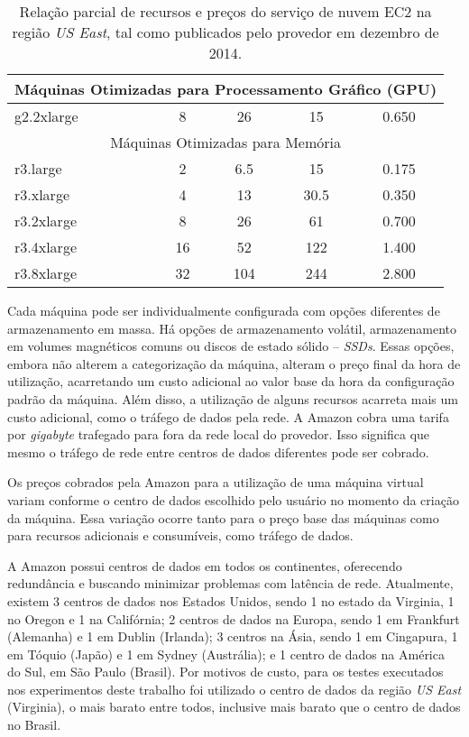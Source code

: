 \begin{table}[t]
\begin{tabular}{|l|c|c|c|c|}
      \multicolumn{5}{|c|}{Máquinas Otimizadas para Processamento Gráfico (GPU)} \\
      \hline      
      g2.2xlarge & 8 & 26 & 15 & 0.650 \\
      \hline      
      \multicolumn{5}{|c|}{Máquinas Otimizadas para Memória} \\
      \hline      
      r3.large & 2 & 6.5 & 15 & 0.175 \\
      r3.xlarge & 4 & 13 & 30.5 & 0.350 \\
      r3.2xlarge & 8 & 26 & 61 & 0.700 \\
      r3.4xlarge & 16 & 52 & 122 & 1.400 \\
      r3.8xlarge & 32 & 104 & 244 & 2.800 \\
    \hline    
  \end{tabular}
  \caption{\label{table:maquinas_ec2}Relação parcial de recursos e preços do serviço de nuvem EC2 na região \emph{US East}, tal como publicados pelo provedor em dezembro de 2014.}
\end{table}


Cada máquina pode ser individualmente configurada com opções diferentes de armazenamento
em massa. Há opções de armazenamento volátil, armazenamento em volumes magnéticos
comuns ou discos de estado sólido -- \emph{SSDs}. Essas opções, embora não alterem
a categorização da máquina, alteram o preço final da hora de utilização, acarretando
um custo adicional ao valor base da hora da configuração padrão da máquina. Além
disso, a utilização de alguns recursos acarreta mais um custo adicional, como o
tráfego de dados pela rede. A Amazon cobra uma tarifa por \emph{gigabyte} trafegado
para fora da rede local do provedor. Isso significa que mesmo o tráfego de rede 
entre centros de dados diferentes pode ser cobrado.

Os preços cobrados pela Amazon para a utilização de uma máquina virtual variam 
conforme o centro de dados escolhido pelo usuário no momento da criação da máquina.
Essa variação ocorre tanto para o preço base das máquinas como para recursos adicionais
e consumíveis, como tráfego de dados.

A Amazon possui centros de dados em todos os continentes, oferecendo redundância
e buscando minimizar problemas com latência de rede. Atualmente, existem 3 centros de
dados nos Estados Unidos, sendo 1 no estado da Virginia, 1 no Oregon e 1 na Califórnia; 2 
centros de dados na Europa, sendo 1 em Frankfurt (Alemanha) e 1 em Dublin (Irlanda); 3 centros na Ásia,
sendo 1 em Cingapura, 1 em Tóquio (Japão) e 1 em Sydney (Austrália); e 1 centro de dados na América do
Sul, em São Paulo (Brasil). Por motivos de custo, para os testes executados nos experimentos 
deste trabalho foi utilizado o centro de dados da região \emph{US East} (Virginia), o
mais barato entre todos, inclusive mais barato que o centro de dados no Brasil.   

